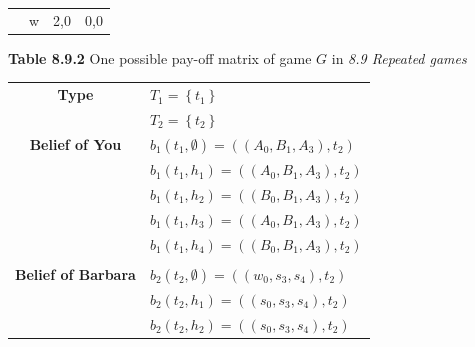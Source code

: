 \documentclass{article}
\begin{document}
\begin{description}
\begin{center}
\begin{tabular}{rrcc}
        \multicolumn{ 1}{c}{{\bf }} &          w &        2,0 &        0,0 \\

        \end{tabular}

        {\bf Table 8.9.2} One possible pay-off matrix of game $G$ in {\it 8.9 Repeated games}\\
    \end{center}




    \begin{center}
        \begin{tabular}{cl}
        \hline
        \hline
        \multicolumn{ 1}{c}{{\bf Type}} &          $T_1=\left\{t_1\right\}$ \\

        \multicolumn{ 1}{c}{{\bf }} &          $T_2=\left\{t_2\right\}$ \\
        \hline
        \multicolumn{ 1}{c}{{\bf Belief of You}} &         $b_1\left(t_1,\emptyset \right)=\left(\left(A_0,B_1,A_3\right),t_2\right)$ \\

        \multicolumn{ 1}{c}{{\bf }} &         $b_1\left(t_1,h_1\right)=\left(\left(A_0,B_1,A_3\right),t_2\right)$ \\

        \multicolumn{ 1}{c}{{\bf }} &         $b_1\left(t_1,h_2\right)=\left(\left(B_0,B_1,A_3\right),t_2\right)$ \\

        \multicolumn{ 1}{c}{{\bf }} &         $b_1\left(t_1,h_3\right)=\left(\left(A_0,B_1,A_3\right),t_2\right)$ \\

        \multicolumn{ 1}{c}{{\bf }} &         $b_1\left(t_1,h_4\right)=\left(\left(B_0,B_1,A_3\right),t_2\right)$ \\\\

        \multicolumn{ 1}{c}{{\bf Belief of Barbara}} &         $b_2\left(t_2,\emptyset \right)=\left(\left(w_0,s_3,s_4\right),t_2\right)$ \\

        \multicolumn{ 1}{c}{{\bf }} &         $b_2\left(t_2,h_1\right)=\left(\left(s_0,s_3,s_4\right),t_2\right)$ \\

        \multicolumn{ 1}{c}{{\bf }} &         $b_2\left(t_2,h_2\right)=\left(\left(s_0,s_3,s_4\right),t_2\right)$ \\


\end{tabular}
\end{center}
\end{description}
\end{document}
